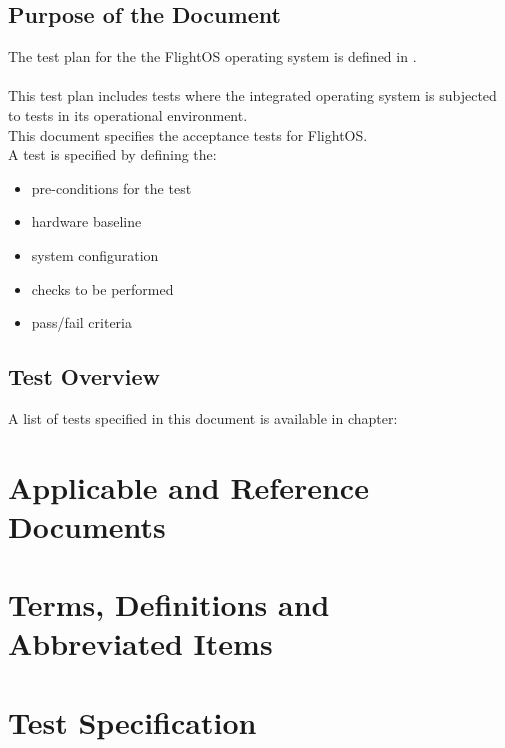 \section{Purpose of the Document}

The test plan for the the FlightOS operating system is defined in
\cite{flightosTP}.\\
\\

\noindent
This test plan includes tests where the integrated operating
system is subjected to tests in its operational environment.\\

\noindent
This document specifies the acceptance tests for FlightOS.\\

\noindent
A test is specified by defining the:
\begin{itemize}
	\item pre-conditions for the test
	\item hardware baseline
	\item system configuration
	\item checks to be performed
	\item pass/fail criteria
\end{itemize}



\section{Test Overview}

A list of tests specified in this document is available in chapter:


\chapter{Applicable and Reference Documents} %

\printbibliography[heading=none]


\chapter{Terms, Definitions and Abbreviated Items}

\printglossary[type=acronym]
\printglossary[type=main, style=altlist]


\chapter{Test Specification}

